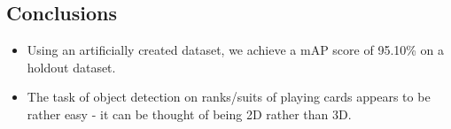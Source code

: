 \documentclass[a0,landscape]{a0poster}
\begin{document}
\begin{multicols}{3}
\begin{center}
\section*{Conclusions}

\begin{itemize}
\item Using an artificially created dataset, we achieve a mAP score of 95.10\% on a holdout dataset.
\item The task of object detection on ranks/suits of playing cards appears to be rather easy - it can be thought of being 2D rather than 3D.

\end{itemize}
  \end{center}
\color{DarkSlateGray} %


\nocite{*} %



\end{multicols}
\end{document}
